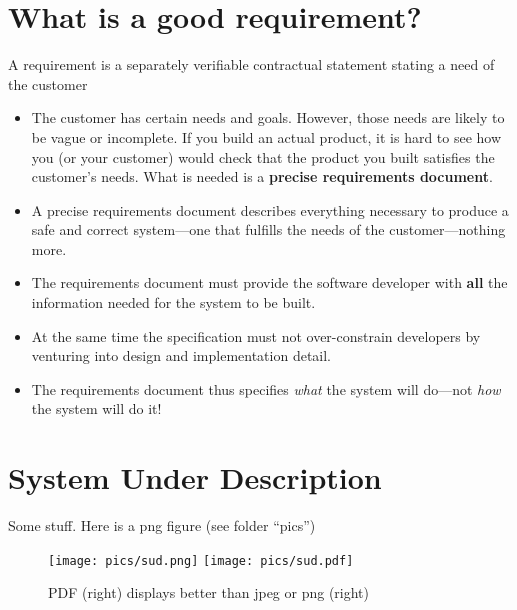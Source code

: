 \section{What is a good requirement?}

\begin{mdframed}[outerlinewidth=0.5,roundcorner=5pt]
A requirement is a separately verifiable contractual statement
stating a need of the customer
\end{mdframed}

\begin{itemize}

\item The customer has certain needs and goals. However, those needs are likely to be vague or incomplete. If you build an actual product, it is hard to see how you (or your customer) would check that the product you built satisfies the customer's needs. What is needed is a \textbf{precise requirements document}.

\item A precise requirements document describes everything necessary to produce a safe and correct system---one that fulfills the needs of the customer---nothing more. 

\item The requirements document must provide the software developer with \textbf{all} the information needed for the system to be built.

\item At the same time the specification must not over-constrain developers by venturing into design and implementation detail.

\item The requirements document thus specifies \emph{what} the system will do---not \emph{how} the system will do it!

\end{itemize}

\section{System Under Description}

Some stuff. Here is a png figure (see folder ``pics'')

\begin{figure}[htb]
\texttt{[image: pics/sud.png]}
\texttt{[image: pics/sud.pdf]}
\caption{PDF (right) displays better than jpeg or png (right)}
\label{fig:1}
\end{figure}


